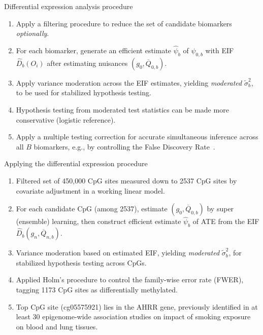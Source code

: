\documentclass{beamer}
\begin{document}

\begin{frame}[c]{Differential expression analysis procedure}

\begin{center}
\begin{enumerate}
  \itemsep6pt
  \item Apply a filtering procedure to reduce the set of candidate
    biomarkers~\citep{tuglus2009modified} \textit{optionally}.
   \item For each biomarker, generate an efficient estimate $\hat{\psi}_b$ of
    $\psi_{0,b}$ with EIF $\hat{D}_b(O_i)$ after estimating nuisances $(g_0,
    \overline{Q}_{0,b})$.
  \item Apply variance moderation across the EIF estimates, yielding
    \textit{moderated} $\tilde{\sigma}_b^2$, to be used for stabilized
    hypothesis testing.
  \item Hypothesis testing from moderated test statistics can be made
    more conservative (logistic reference).
  \item Apply a multiple testing correction for accurate simultaneous inference
    across all $B$ biomarkers, e.g., by controlling the False
    Discovery Rate~\citep{benjamini1995controlling}.
\end{enumerate}
\end{center}

\note{
}
\end{frame}


\begin{frame}[c]{Applying the differential expression procedure}

\begin{center}
\begin{enumerate}
  \itemsep6pt
  \item Filtered set of 450,000 CpG sites measured down to 2537 CpG sites by
    covariate adjustment in a working linear model.
   \item For each candidate CpG (among 2537), estimate $(g_0,
     \overline{Q}_{0,b})$ by super (ensemble) learning, then construct efficient
     estimate $\hat{\psi}_b$ of ATE from the EIF $\hat{D}_b(g_n,
     \overline{Q}_{n,b})$.
  \item Variance moderation based on estimated EIF, yielding \textit{moderated}
    $\tilde{\sigma}_b^2$, for stabilized hypothesis testing across CpGs.
  \item Applied Holm's procedure to control the family-wise error rate (FWER),
    tagging 1173 CpG sites as differentially methylated.
  \item Top CpG site (cg05575921) lies in the AHRR gene, previously
    identified in at least 30 epigenome-wide association studies on impact of
    smoking exposure on blood and lung tissues.
\end{enumerate}
\end{center}

\note{
}
\end{frame}
\end{document}
